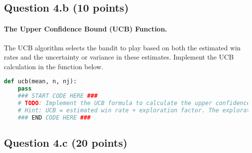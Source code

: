 \documentclass[12pt]{article}
\begin{document}
\subsection*{Question 4.b (10 points) } 
\paragraph{The Upper Confidence Bound (UCB) Function.}
The UCB algorithm selects the bandit to play based on both the estimated win rates and the uncertainty or variance in these estimates. Implement the UCB calculation in the function below.
\begin{solution}
\begin{lstlisting}[language=Python]
def ucb(mean, n, nj):
    pass
    ### START CODE HERE ###
    # TODO: Implement the UCB formula to calculate the upper confidence bound ###
    # Hint: UCB = estimated win rate + exploration factor. The exploration factor can be calculated using np.sqrt(2 * np.log(n) / nj)
    ### END CODE HERE ###
\end{lstlisting}
\end{solution}

\subsection*{Question 4.c (20 points) } 
\end{document}
